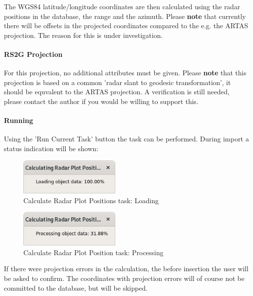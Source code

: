The WGS84 latitude/longitude coordinates are then calculated using the radar positions in the database, the range and the azimuth. Please \textbf{note} that currently there will be offsets in the projected coordinates compared to the e.g. the ARTAS projection. The reason for this is under investigation.

\paragraph{RS2G Projection}

For this projection, no additional attributes must be given. Please \textbf{note} that this projection is based on a common 'radar slant to geodesic transformation', it should be equvalent to the ARTAS projection. A verification is still needed, please contact the author if you would be willing to support this.

\paragraph{Running}

Using the 'Run Current Task' button the task can be performed. During import a status indication will be shown:

\begin{figure}[H]
  \center
    \includegraphics[width=5cm]{../screenshots/task_calc_radar_load.png}
  \caption{Calculate Radar Plot Positions task: Loading}
\end{figure}

\begin{figure}[H]
  \center
    \includegraphics[width=5cm]{../screenshots/task_calc_radar_process.png}
  \caption{Calculate Radar Plot Position task: Processing}
\end{figure}

If there were projection errors in the calculation, the before insertion the user will be asked to confirm. The coordinates with projection errors will of course not be committed to the database, but will be skipped.

